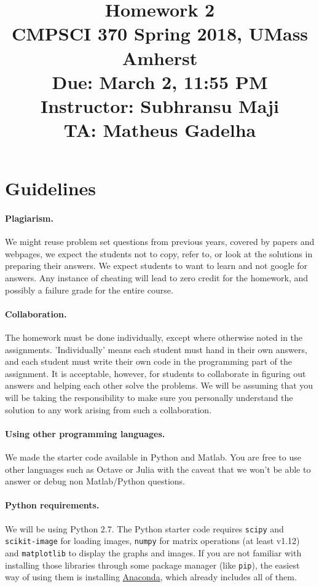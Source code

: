 \documentclass[10pt,letterpaper]{article}
\title{
  Homework 2 \\
  \Large{CMPSCI 370 Spring 2018, UMass Amherst} \\
  \Large{Due: March 2, 11:55 PM} \\
  \Large{Instructor: Subhransu Maji} \\
  \Large{TA: Matheus Gadelha}
}
\date{}
\newcommand{\cmd}[1] {{\color{blue}\texttt{#1}}}
\begin{document}
\maketitle

\renewcommand\thesubsection{\thesection.\alph{subsection}}


\section*{Guidelines}

\paragraph{Plagiarism.} We might reuse problem set questions from previous years, covered by papers and webpages, we expect the students not to copy, refer to, or look at the solutions in preparing their answers. We expect students to want to learn and not google for answers. Any instance of cheating will lead to zero credit for the homework, and possibly a failure grade for the entire course.

\paragraph{Collaboration.} The homework must be done individually, except where otherwise noted in the assignments. 'Individually' means each student must hand in their own answers, and each student must write their own code in the programming part of the assignment. It is acceptable, however, for students to collaborate in figuring out answers and helping each other solve the problems. We will be assuming that you will be taking the responsibility to make sure you personally understand the solution to any work arising from such a collaboration.

\paragraph{Using other programming languages.} We made the starter code available in Python and Matlab. You are free to use other languages such as Octave or Julia with the caveat that we won't be able to answer or debug non Matlab/Python questions.

\paragraph{Python requirements.} We will be using Python 2.7. The Python starter code requires \cmd{scipy} and \cmd{scikit-image} for loading images, \cmd{numpy} for matrix operations (at least v1.12) and
\cmd{matplotlib} to display the graphs and images.
If you are not familiar with installing those libraries through some package manager (like \cmd{pip}), the easiest way of using them is installing \href{https://conda.io/docs/user-guide/install/index.html}{Anaconda}, which already includes all of them.
%
\end{document}
